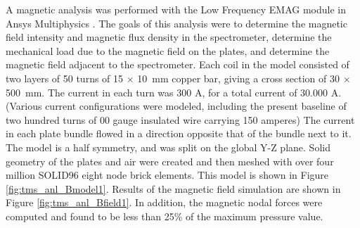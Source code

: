 A magnetic analysis was performed with the Low Frequency EMAG module in Ansys Multiphysics \cite{ANSYS}.   The goals of this analysis were to determine the magnetic field intensity and magnetic flux density in the spectrometer, determine the mechanical load due to the magnetic field on the plates, and determine the magnetic field adjacent to the spectrometer.   Each coil in the model consisted of two layers of \num{50} turns of \num{15} $\times$ \SI{10}{\mm} copper bar, giving a cross section of \num{30} $\times$ \SI{500}{\mm}.  The current in each turn was \num{300} A, for a total current of \num{30,000} A. (Various current configurations were modeled, including the present baseline of two hundred turns of 00 gauge insulated wire carrying 150 amperes) The current in each plate bundle flowed in a direction opposite that of the bundle next to it.  The model is a half symmetry, and was split on the global Y-Z plane. Solid geometry of the plates and air were created and then meshed with over four million SOLID96 eight node brick elements.   This model is shown in Figure \ref{fig:tms_anl_Bmodel1}.  Results of the magnetic field simulation are shown in Figure \ref{fig:tms_anl_Bfield1}.   In addition, the magnetic nodal forces were computed and found to be less than 25\% of the maximum pressure value.  
\iffalse



